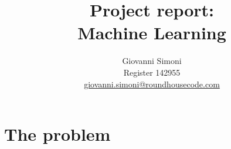 \documentclass[10pt,a4paper]{article}
\title {
    Project report:\\
    Machine Learning
}
\author{
    Giovanni Simoni\\
    Register 142955\\
    \href{mailto:giovanni.simoni@roundhousecode.com}
         {giovanni.simoni@roundhousecode.com}
}
\begin{document}
\maketitle

    \tableofcontents

    \newpage
    \section{ The problem } \label{sec:TheProblem}
    
\end{document}
